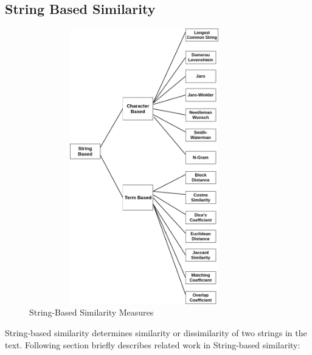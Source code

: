 \documentclass{article}
\begin{document}
\subsection{String Based Similarity}
\centering
\begin{figure}[h]
\includegraphics[width=10cm,height=12cm]{string_similarity.png}
\caption{String-Based Similarity Measures\cite{survey}}
\end{figure}
\begin{flushleft}
String-based similarity determines similarity or dissimilarity of two strings in the text. Following section briefly describes related work in String-based similarity: 
\end{flushleft}
\end{document}
